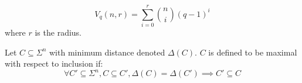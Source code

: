 \begin{definition}[Volume]
  \label{def:Vol}
  \leanok
  \[V_{q}(n,r) = \sum^{r}_{i = 0} \binom{n}{i}(q-1)^{i}\]
  where $r$ is the radius.
\end{definition}

\begin{definition}
  \label{def:maximalWrtInclusion}
  \leanok
  Let $C\subseteq \Sigma^{n}$ with minimum distance denoted $\Delta(C)$.
  $C$ is defined to be maximal with respect to inclusion if:
  \[\forall C' \subseteq \Sigma^{n}, C\subseteq C', \Delta(C) = \Delta(C') \implies C'\subseteq C\]
\end{definition}
